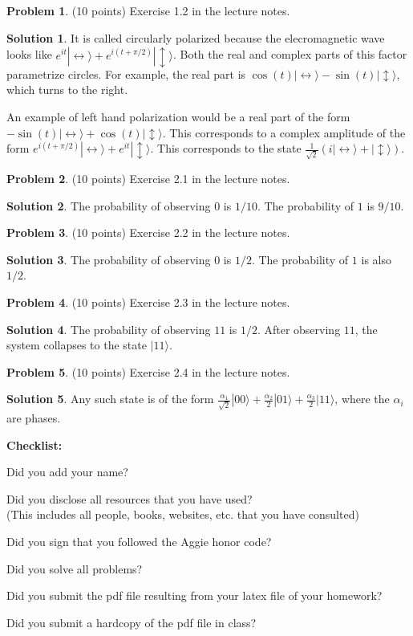 \documentclass{article}
\theoremstyle{definition}
\newtheorem{problem}{Problem}
\newtheorem*{solution}{Solution}
\newcommand{\checklist}{\noindent\textbf{Checklist:}
\begin{compactitem}[$\Box$] 
\item Did you add your name? 
\item Did you disclose all resources that you have used? \\
(This includes all people, books, websites, etc. that you have consulted)
\item Did you sign that you followed the Aggie honor code? 
\item Did you solve all problems? 
\item Did you submit the pdf file resulting from your latex file
  of your homework?
\item Did you submit a hardcopy of the pdf file in class? 
\end{compactitem}
}
\begin{document}
\begin{problem} (10 points) 
Exercise 1.2 in the lecture notes.
\end{problem}
\begin{solution}
It is called circularly polarized because the elecromagnetic wave looks like
$ e^{it} | \leftrightarrow \rangle + e^{i(t + \pi/2)} |\updownarrow \rangle$.
Both the real and complex parts of this factor parametrize circles.  For example, the 
real part is $\cos(t) | \leftrightarrow \rangle - \sin(t) |\updownarrow \rangle $, which turns to the right.

An example of left hand polarization would be a real part of the form $ -\sin(t) | \leftrightarrow \rangle + \cos(t) |\updownarrow \rangle $.  This
corresponds to a complex amplitude of the form $ e^{i(t + \pi/2)}| \leftrightarrow \rangle + e^{it} |\updownarrow \rangle $.  This
corresponds to the state $\frac{1}{\sqrt 2} \left( i | \leftrightarrow \rangle + |\updownarrow \rangle \right)$.
\end{solution}

\begin{problem} (10 points) 
Exercise 2.1 in the lecture notes.
\end{problem}
\begin{solution}
The probability of observing $0$ is $1/10$.  The probability of $1$ is $9/10$.
\end{solution}

\begin{problem} (10 points) 
Exercise 2.2 in the lecture notes.
\end{problem}
\begin{solution}
The probability of observing $0$ is $1/2$.  The probability of $1$ is also $1/2$.
\end{solution}

\begin{problem} (10 points) 
Exercise 2.3 in the lecture notes.
\end{problem}
\begin{solution}
The probability of observing $11$ is $1/2$.  After observing $11$, the system collapses to the state $|11\rangle$.
\end{solution}

\begin{problem} (10 points) 
Exercise 2.4 in the lecture notes.
\end{problem}
\begin{solution}
Any such state is of the form $\frac{\alpha_1}{\sqrt 2}|00 \rangle + \frac{\alpha_2}{2} |01\rangle + \frac{\alpha_3}{2} |11\rangle$, where the $\alpha_i$ are phases.
\end{solution}







\goodbreak
\checklist
\end{document}
